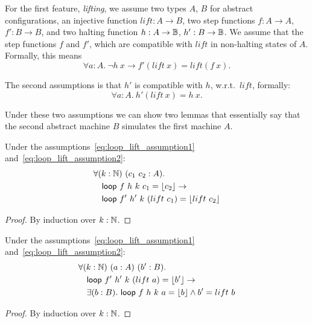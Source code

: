 For the first feature, \emph{lifting}, we assume two types $A$, $B$ for abstract configurations, an injective function $lift : A \to B$, two step
functions $f : A \to A$, $f' : B \to B$, and two halting function $h : A \rightarrow \mathbb{B}$, $h' : B \rightarrow \mathbb{B}$.  We assume that the step functions $f$ and
$f'$, which are compatible with $lift$ in non-halting states of $A$.  Formally, this means
\begin{equation}
  \label{eq:loop_lift_assumption1}
  \forall a:A.~\lnot h~x \rightarrow f' (lift~x) = lift (f~x).
\end{equation}

The second assumptions is that $h'$ is compatible with $h$, w.r.t.\ $lift$, formally:
\begin{equation}
  \label{eq:loop_lift_assumption2}
  \forall a:A.~h'(lift~x)=h~x.
\end{equation}

Under these two assumptions we can show two lemmas that essentially say that the second abstract machine $B$ simulates the first machine $A$.
\begin{lemma}
  \label{lem:loop_lift}
  Under the assumptions~\ref{eq:loop_lift_assumption1} and~\ref{eq:loop_lift_assumption2}:
  \begin{alignat*}{1}
    & \forall (k:\mathbb{N})~(c_1~c_2 : A). \\
    & \quad \textsf{loop}~f ~h ~k~c_1 = \left\lfloor {c_2} \right\rfloor \rightarrow \\
    & \quad \textsf{loop}~f'~h'~k~(lift~c_1) = \left\lfloor {lift~c_2} \right\rfloor
  \end{alignat*}
\end{lemma}
\begin{proof}
  By induction over $k:\mathbb{N}$.
\end{proof}
\begin{lemma}
  \label{lem:loop_unlift}
  Under the assumptions~\ref{eq:loop_lift_assumption1} and~\ref{eq:loop_lift_assumption2}:
  \begin{alignat*}{1}
    & \forall (k:\mathbb{N})~(a:A)~(b':B). \\
    & \quad \textsf{loop}~f'~h'~k~(lift~a) = \left\lfloor {b'} \right\rfloor \rightarrow \\
    & \quad \exists (b:B).~\textsf{loop}~f~h~k~a = \left\lfloor {b} \right\rfloor \land b'=lift~b
  \end{alignat*}
\end{lemma}
\begin{proof}
  By induction over $k:\mathbb{N}$.
\end{proof}

